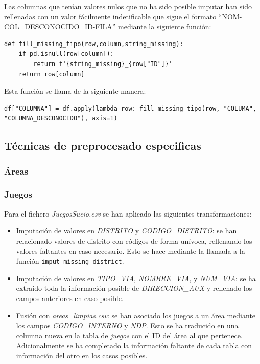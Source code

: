 \documentclass[]{article}
\begin{document}
\begin{itemize}
    Las columnas que tenían valores nulos que no ha sido posible imputar han sido rellenadas con un valor fácilmente indetificable que sigue el formato ``NOM-COL\_DESCONOCIDO\_ID-FILA'' mediante la siguiente función:

    \begin{lstlisting}
def fill_missing_tipo(row,column,string_missing):
    if pd.isnull(row[column]):
        return f'{string_missing}_{row["ID"]}'
    return row[column]
    \end{lstlisting}

    Esta función se llama de la siguiente manera:

    \begin{lstlisting}
df["COLUMNA"] = df.apply(lambda row: fill_missing_tipo(row, "COLUMA", "COLUMNA_DESCONOCIDO"), axis=1)
    \end{lstlisting}

\end{itemize}

\subsection{Técnicas de preprocesado especificas}
\label{subsec:preprocessespecifico}

\subsubsection{Áreas}
\label{subsubsec:preprocessarea}

\subsubsection{Juegos}
\label{subsubsec:preprocessjuego}
Para el fichero \textit{JuegosSucio.csv} se han aplicado las siguientes transformaciones:

\begin{itemize}
    \item Imputación de valores en \textit{DISTRITO} y \textit{CODIGO\_DISTRITO}: se han relacionado valores de distrito con códigos de forma unívoca, rellenando los valores faltantes en caso necesario. Esto se hace mediante la llamada a la función \texttt{imput\_missing\_district}.
    \item Imputación de valores en \textit{TIPO\_VIA}, \textit{NOMBRE\_VIA}, y \textit{NUM\_VIA}: se ha extraído toda la información posible de \textit{DIRECCION\_AUX} y rellenado los campos anteriores en caso posible.
    \item Fusión con \textit{areas\_limpias.csv}: se han asociado los juegos a un área mediante los campos \textit{CODIGO\_INTERNO} y \textit{NDP}. Esto se ha traducido en una columna nueva en la tabla de \textit{juegos} con el ID del área al que pertenece. Adicionalmente se ha completado la información faltante de cada tabla con información del otro en los casos posibles.
\end{itemize}
\end{document}
